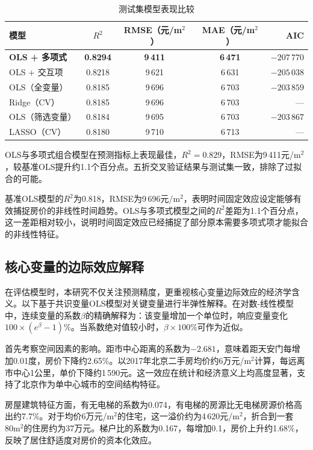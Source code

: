 \documentclass[12pt,a4paper]{ctexart}
\begin{document}
\begin{table}[H]
\centering
\caption{测试集模型表现比较}
\label{tab:model_comparison}
\begin{tabular}{lcccr}
\toprule
模型 & $R^{2}$ & RMSE（元/m$^{2}$） & MAE（元/m$^{2}$） & AIC \\
\midrule
\textbf{OLS + 多项式}  & \textbf{0.8294} & \textbf{9\,411} & \textbf{6\,471} & \textbf{$-207\,770$} \\
OLS + 交互项          & 0.8218 & 9\,621 & 6\,631 & $-205\,038$ \\
OLS（全变量）         & 0.8185 & 9\,696 & 6\,703 & $-203\,859$ \\
Ridge（CV）           & 0.8185 & 9\,696 & 6\,703 & --- \\
OLS（筛选变量）       & 0.8184 & 9\,695 & 6\,703 & $-203\,867$ \\
LASSO（CV）           & 0.8180 & 9\,710 & 6\,713 & --- \\
\bottomrule
\end{tabular}
\end{table}

OLS与多项式组合模型在预测指标上表现最佳，$R^{2}=0.829$，RMSE为9\,411元/m$^{2}$，较基准OLS提升约1.1个百分点。五折交叉验证结果与测试集一致，排除了过拟合的可能。

基准OLS模型的$R^{2}$为0.818，RMSE为9\,696元/m$^{2}$，表明时间固定效应设定能够有效捕捉房价的非线性时间趋势。OLS与多项式模型之间的$R^{2}$差距为1.1个百分点，这一差距相对较小，说明时间固定效应已经捕捉了部分原本需要多项式项才能拟合的非线性特征。

\subsection{核心变量的边际效应解释}

在评估模型时，本研究不仅关注预测精度，更重视核心变量边际效应的经济学含义。以下基于共识变量OLS模型对关键变量进行半弹性解释。在对数-线性模型中，连续变量的系数$\beta$的精确解释为：该变量增加一个单位时，响应变量变化$100\times(e^{\beta}-1)\%$。当系数绝对值较小时，$\beta\times100\%$可作为近似。

首先考察空间因素的影响。距市中心距离的系数为$-2.681$，意味着距天安门每增加0.01度，房价下降约2.65\%。以2017年北京二手房均价约6万元/m$^{2}$计算，每远离市中心1公里，单价下降约1\,590元。这一效应在统计和经济意义上均高度显著，支持了北京作为单中心城市的空间结构特征。

房屋建筑特征方面，有无电梯的系数为0.074，有电梯的房源比无电梯房源价格高出约7.7\%。对于均价6万元/m$^{2}$的住宅，这一溢价约为4\,620元/m$^{2}$，折合到一套80m$^{2}$的住房约为37万元。梯户比的系数为0.167，每增加0.1，房价上升约1.68\%，反映了居住舒适度对房价的资本化效应。
\end{document}
